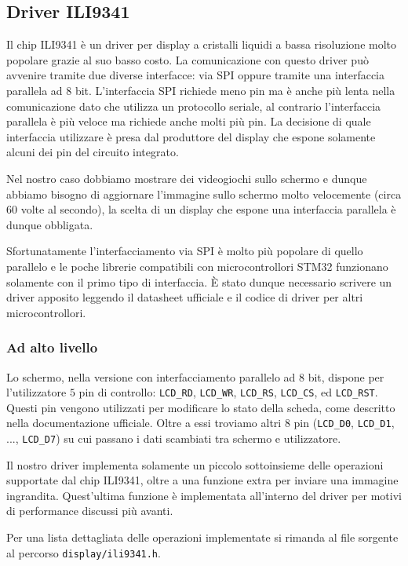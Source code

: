 \documentclass[hidelinks,12pt]{article}
\begin{document}
\subsection{Driver ILI9341}
Il chip ILI9341 è un driver per display a cristalli liquidi a bassa risoluzione
molto popolare grazie al suo basso costo. La comunicazione con questo driver
può avvenire tramite due diverse interfacce: via SPI oppure tramite una
interfaccia parallela ad 8 bit.
L'interfaccia SPI richiede meno pin ma è anche più lenta nella comunicazione
dato che utilizza un protocollo seriale, al contrario l'interfaccia parallela
è più veloce ma richiede anche molti più pin.
La decisione di quale interfaccia utilizzare è presa dal produttore del
display che espone solamente alcuni dei pin del circuito integrato.

Nel nostro caso dobbiamo mostrare dei videogiochi sullo schermo e dunque
abbiamo bisogno di aggiornare l'immagine sullo schermo molto velocemente
(circa 60 volte al secondo), la scelta di un display che espone una
interfaccia parallela è dunque obbligata.

Sfortunatamente l'interfacciamento via SPI è molto più popolare di quello
parallelo e le poche librerie compatibili con microcontrollori STM32 funzionano
solamente con il primo tipo di interfaccia.
È stato dunque necessario scrivere un driver apposito leggendo il datasheet
ufficiale\cite{ili9341} e il codice di driver per altri microcontrollori.

\subsubsection{Ad alto livello}
Lo schermo, nella versione con interfacciamento parallelo ad 8 bit, dispone
per l'utilizzatore $5$ pin di controllo: \texttt{LCD\_RD}, \texttt{LCD\_WR},
\texttt{LCD\_RS}, \texttt{LCD\_CS}, ed \texttt{LCD\_RST}.
Questi pin vengono utilizzati per modificare lo stato della scheda, come
descritto nella documentazione ufficiale.
Oltre a essi troviamo altri $8$ pin (\texttt{LCD\_D0}, \texttt{LCD\_D1}, ...,
\texttt{LCD\_D7}) su cui passano i dati scambiati tra schermo e utilizzatore.

Il nostro driver implementa solamente un piccolo sottoinsieme delle operazioni
supportate dal chip ILI9341, oltre a una funzione extra per inviare
una immagine ingrandita.
Quest'ultima funzione è implementata all'interno del driver per motivi di
performance discussi più avanti.

Per una lista dettagliata delle operazioni implementate si rimanda al file
sorgente al percorso
\texttt{display/ili9341.h}.
\end{document}
